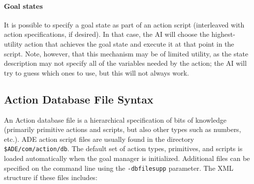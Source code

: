 \documentclass[11pt,letterpaper]{article}
\begin{document}
\paragraph{Goal states} It is possible to specify a goal state as part
of an action script (interleaved with action specifications, if
desired).  In that case, the AI will choose the highest-utility action
that achieves the goal state and execute it at that point in the
script.  Note, however, that this mechanism may be of limited utility,
as the state description may not specify all of the variables needed
by the action; the AI will try to guess which ones to use, but this
will not always work.

\subsection{Action Database File Syntax}

An Action database file is a hierarchical specification of bits of 
knowledge (primarily primitive actions and scripts, but also other 
types such as numbers, etc.).  ADE action script files are usually 
found in the directory {\tt \$ADE/com/action/db}.  The default set of
action types, primitives, and scripts is loaded automatically when the
goal manager is initialized.  Additional files can be specified on the
command line using the {\tt -dbfilesupp} parameter.  The XML structure
if these files includes:
\end{document}
